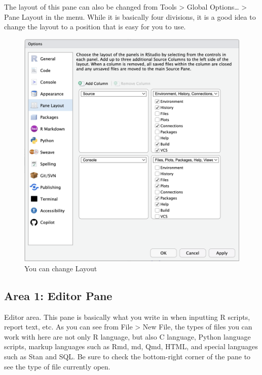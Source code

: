 \documentclass[
  a4paper,
]{book}
\begin{document}
The layout of this pane can also be changed from Tools \textgreater{}
Global Options\ldots{} \textgreater{} Pane Layout in the menu. While it
is basically four divisions, it is a good idea to change the layout to a
position that is easy for you to use.

\begin{figure}[H]

{\centering \includegraphics{../common/images/01_PaneLayout.png}

}

\caption{You can change Layout}

\end{figure}%

\subsection{Area 1: Editor Pane}\label{area-1-editor-pane}

Editor area. This pane is basically what you write in when inputting R
scripts, report text, etc. As you can see from File \textgreater{} New
File, the types of files you can work with here are not only R language,
but also C language, Python language scripts, markup languages such as
Rmd, md, Qmd, HTML, and special languages such as Stan and SQL. Be sure
to check the bottom-right corner of the pane to see the type of file
currently open.
\end{document}
